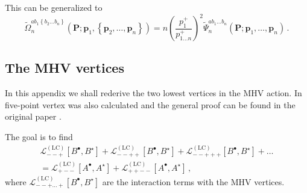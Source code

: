 \documentclass[english,american]{article}
\begin{document}
This can be generalized to
\begin{equation}
\tilde{\Omega}_{n}^{ab_{1}\left\{ b_{2}\dots b_{n}\right\} }\left(\mathbf{P};\mathbf{p}_{1},\left\{ \mathbf{p}_{2},\dots,\mathbf{p}_{n}\right\} \right)=n\left(\frac{p_{1}^{+}}{p_{1\dots n}^{+}}\right)^{2}\tilde{\Psi}_{n}^{ab_{1}\dots b_{n}}\left(\mathbf{P};\mathbf{p}_{1},\dots,\mathbf{p}_{n}\right)\,.
\end{equation}


\subsection{The MHV vertices}

In this appendix we shall rederive the two lowest vertices in the MHV action.
 In \citep{Ettle2006b}
five-point vertex was also calculated and the general proof can be found in the
original paper \citep{Mansfield2006}.

The goal is to find
\begin{multline}
\mathcal{L}_{--+}^{\left(\mathrm{LC}\right)}\left[B^{\bullet},B^{\star}\right]+\mathcal{L}_{--++}^{\left(\mathrm{LC}\right)}\left[B^{\bullet},B^{\star}\right]+\mathcal{L}_{--+++}^{\left(\mathrm{LC}\right)}\left[B^{\bullet},B^{\star}\right]+\dots\\
=\mathcal{L}_{+--}^{\left(\mathrm{LC}\right)}\left[A^{\bullet},A^{\star}\right]+\mathcal{L}_{++--}^{\left(\mathrm{LC}\right)}\left[A^{\bullet},A^{\star}\right]\,,
\end{multline}
where $\mathcal{L}_{--+\dots+}^{\left(\mathrm{LC}\right)}\left[B^{\bullet},B^{\star}\right]$
are the interaction terms with the MHV vertices.
\end{document}
